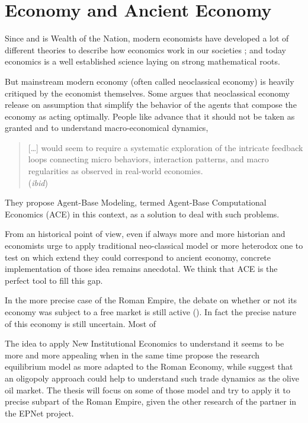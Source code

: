 \documentclass[a4paper]{article}
\begin{document}
\section{Economy and Ancient Economy}

Since \cite{smith1776wealthofnation} and is  Wealth of the Nation, modern economists have developed a lot of different theories to describe how economics work in our societies ; and today economics is a well established science laying on strong mathematical roots. 

But mainstream modern economy (often called neoclassical economy) is heavily critiqued by the economist themselves. Some argues that neoclassical economy release on assumption that simplify the behavior of the agents that compose the economy as acting optimally. People like \cite{lebaron2008modelingmacroeconomiesasopenendeddynamicsystemsofinteractingagents} advance that it should not be taken as granted and to understand macro-economical dynamics, 
\begin{quote}
	[\ldots] would seem to require a systematic exploration of the intricate feedback loops connecting micro behaviors, interaction patterns, and macro regularities as observed in real-world economies.\\
	(\emph{ibid})
\end{quote}

They propose Agent-Base Modeling, termed Agent-Base Computational Economics (ACE) in this context, as a solution to deal with such problems. 

From an historical point of view, even if always more and more historian and economists urge to apply traditional neo-classical model or more heterodox one to test on which extend they could correspond to ancient economy, concrete implementation of those idea remains anecdotal. We think that ACE is the perfect tool to fill this gap.

In the more precise case of the Roman Empire, the debate on whether or not its economy was subject to a free market is still active (\cite{temin2013theromanmarketeconomy}). In fact the precise nature of this economy is still uncertain. Most of 

The idea to apply New Institutional Economics to understand it seems to be more and more appealing \citep{bang2009ancienteconomy,verboven2015theknightwhosaynie} when in the same time \cite{grantham2015reserarchequilib} propose the \cite{diamond1982aggregatedemandmanagementinsearchequilibrium}research equilibrium model as more adapted to the Roman Economy, while \cite{poblome2013moneymakespotterygoround}  suggest that an oligopoly approach \citep{vives2001oligopoly} could help to understand such trade dynamics as the olive oil market. The thesis will focus on some of those model and try to apply it  to precise subpart of the Roman Empire, given the other research of the partner in the EPNet project.
\end{document}
